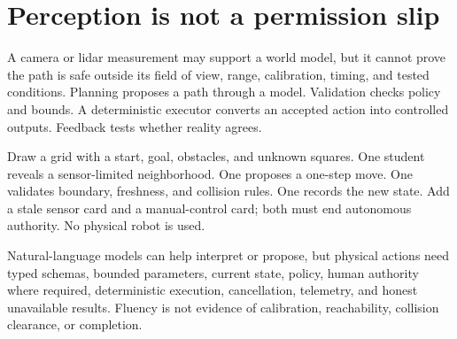 \section*{Perception is not a permission slip}

A camera or lidar measurement may support a world model, but it cannot prove the path is safe outside its field of view, range, calibration, timing, and tested conditions. Planning proposes a path through a model. Validation checks policy and bounds. A deterministic executor converts an accepted action into controlled outputs. Feedback tests whether reality agrees.

\begin{buildbox}[title={OFFLINE MISSION SIMULATOR}]
Draw a grid with a start, goal, obstacles, and unknown squares. One student reveals a sensor-limited neighborhood. One proposes a one-step move. One validates boundary, freshness, and collision rules. One records the new state. Add a stale sensor card and a manual-control card; both must end autonomous authority. No physical robot is used.
\end{buildbox}

\begin{advancedbox}[title={AI PROPOSES; VERIFIED SOFTWARE DISPOSES}]
Natural-language models can help interpret or propose, but physical actions need typed schemas, bounded parameters, current state, policy, human authority where required, deterministic execution, cancellation, telemetry, and honest unavailable results. Fluency is not evidence of calibration, reachability, collision clearance, or completion.
\end{advancedbox}
